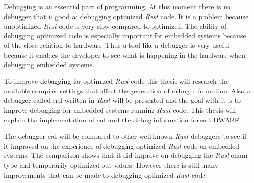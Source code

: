 Debugging is an essential part of programming.
At this moment there is no debugger that is good at debugging optimized \emph{Rust} code.
It is a problem because unoptimized \emph{Rust} code is very slow compared to optimized.
The ability of debugging optimized code is especially important for embedded systems because of the close relation to hardware.
Thus a tool like a debugger is very useful because it enables the developer to see what is happening in the hardware when debugging embedded systems.


To improve debugging for optimized \emph{Rust} code this thesis will research the available compiler settings that affect the generation of debug information.
Also a debugger called \acrshort{erd} written in \emph{Rust} will be presented and the goal with it is to improve debugging for embedded systems running \emph{Rust} code.
This thesis will explain the implementation of \acrshort{erd} and the debug information format \acrshort{DWARF}.


The debugger \acrshort{erd} will be compared to other well known \emph{Rust} debuggers to see if it improved on the experience of debugging optimized \emph{Rust} code on embedded systems.
The comparison shows that it did improve on debugging the \emph{Rust} enum type and temporarily optimized out values.
However there is still many improvements that can be made to debugging optimized \emph{Rust} code.


